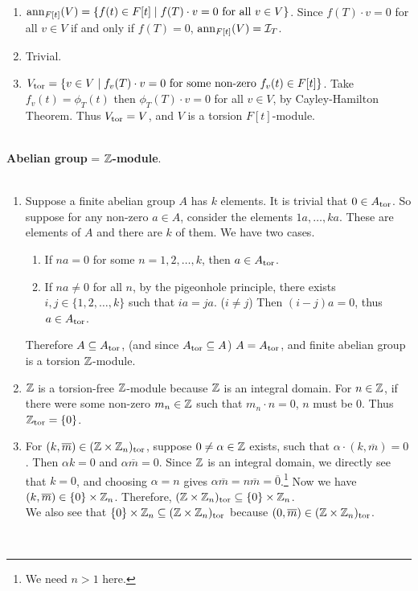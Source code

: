 \\
\begin{enumerate}
	\item $\operatorname{ann}_{F[t]}(V) = \{f(t)\in F[t]\mid f(T)\cdot v = 0 \text{ for all } v \in V\}$. Since $f(T)\cdot v = 0$ for all $v\in V$ if and only if $f(T) = 0$, $\operatorname{ann}_{F[t]}(V) = \mathcal{I}_T$.
	\item Trivial.
	\item $V_{\text{tor}} = \{v\in V\mid f_v(T)\cdot v = 0 \text{ for some non-zero } f_v(t)\in F[t]\}$. Take $f_v(t) = \phi_T(t)$ then $\phi_T(T)\cdot v = 0$ for all $v\in V$, by Cayley-Hamilton Theorem. Thus $V_{\text{tor}} = V$, and $V$ is a torsion $F[t]$-module.
\end{enumerate}~
\\
 \textbf{Abelian group} = \textbf{$\mathbb{Z}$-module}.\\
\\
\begin{enumerate}
	\item Suppose a finite abelian group $A$ has $k$ elements. It is trivial that $0 \in A_{\text{tor}}$. So suppose for any non-zero $a\in A$, consider the elements $1a, \dots, ka$. These are elements of $A$ and there are $k$ of them. We have two cases.
	\begin{enumerate}
		\item If $na = 0$ for some $n = 1, 2, \dots, k$, then $a \in A_{\text{tor}}$.
		\item If $na \neq 0$ for all $n$, by the pigeonhole principle, there exists $i, j\in \{1, 2, \dots, k\}$ such that $ia = ja$. ($i\neq j$) Then $(i - j)a = 0$, thus $a\in A_{\text{tor}}$.
	\end{enumerate}
	Therefore $A\subseteq A_{\text{tor}}$, (and since $A_{\text{tor}}\subseteq A$) $A = A_{\text{tor}}$, and finite abelian group is a torsion $\mathbb{Z}$-module.
	\item $\mathbb{Z}$ is a torsion-free $\mathbb{Z}$-module because $\mathbb{Z}$ is an integral domain. For $n\in \mathbb{Z}$, if there were some non-zero $m_n \in \mathbb{Z}$ such that $m_n \cdot n = 0$, $n$ must be 0. Thus $\mathbb{Z}_{\text{tor}} = \{0\}$.
	\item For $(k, \overline{m})\in (\mathbb{Z}\times \mathbb{Z}_n)_{\text{tor}}$, suppose $0\neq \alpha \in \mathbb{Z}$ exists, such that $\alpha \cdot (k, \overline{m}) = 0$. Then $\alpha k =0$ and $\alpha \overline{m} = 0$. Since $\mathbb{Z}$ is an integral domain, we directly see that $k = 0$, and choosing $\alpha = n$ gives $\alpha\overline{m} = n\overline{m} = \overline{0}$.\footnote{We need $n>1$ here.} Now we have $(k, \overline{m})\in \{0\}\times \mathbb{Z}_n$. Therefore, $(\mathbb{Z}\times \mathbb{Z}_n)_{\text{tor}} \subseteq \{0\}\times \mathbb{Z}_n$.\\
	We also see that $\{0\}\times \mathbb{Z}_n \subseteq (\mathbb{Z}\times\mathbb{Z}_n)_{\text{tor}}$ because $(0, \overline{m}) \in (\mathbb{Z}\times\mathbb{Z}_n)_{\text{tor}}$.
\end{enumerate}~
